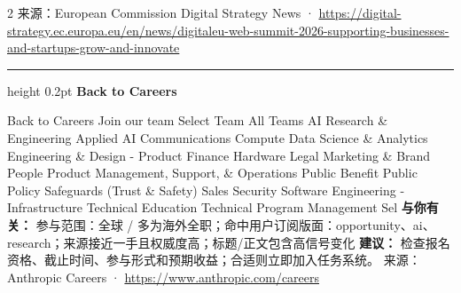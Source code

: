 \documentclass[10.5pt]{ctexart}
\begin{document}
\begin{multicols}{2}
{\footnotesize\color{ormuted} 来源：European Commission Digital Strategy News · \url{https://digital-strategy.ec.europa.eu/en/news/digitaleu-web-summit-2026-supporting-businesses-and-startups-grow-and-innovate}}
\vspace{2mm}
\hrule height 0.2pt
\vspace{2mm}
{\large\bfseries Back to Careers}\par
Back to Careers Join our team Select Team All Teams AI Research \& Engineering Applied AI Communications Compute Data Science \& Analytics Engineering \& Design - Product Finance Hardware Legal Marketing \& Brand People Product Management, Support, \& Operations Public Benefit Public Policy Safeguards (Trust \& Safety) Sales Security Software Engineering - Infrastructure Technical Education Technical Program Management Sel
\textbf{与你有关：} 参与范围：全球 / 多为海外全职；命中用户订阅版面：opportunity、ai、research；来源接近一手且权威度高；标题/正文包含高信号变化
\textbf{建议：} 检查报名资格、截止时间、参与形式和预期收益；合适则立即加入任务系统。
{\footnotesize\color{ormuted} 来源：Anthropic Careers · \url{https://www.anthropic.com/careers}}
\end{multicols}
\end{document}

